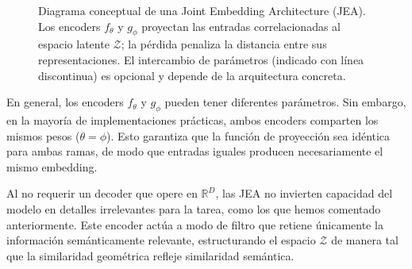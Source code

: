 \begin{figure}[H]
\centering
{}
\caption{Diagrama conceptual de una Joint Embedding Architecture (JEA). Los encoders $f_\theta$ y $g_\phi$ proyectan las entradas correlacionadas al espacio latente $\mathcal{Z}$; la pérdida penaliza la distancia entre sus representaciones. El intercambio de parámetros (indicado con línea discontinua) es opcional y depende de la arquitectura concreta.}
\label{fig:jea_diagram}
\end{figure}

En general, los encoders $f_{\theta}$ y $g_{\phi}$ pueden tener diferentes parámetros. Sin embargo, en la mayoría de implementaciones prácticas, ambos encoders comparten los mismos pesos ($\theta = \phi$). Esto garantiza que la función de proyección sea idéntica para ambas ramas, de modo que entradas iguales producen necesariamente el mismo embedding.

Al no requerir un decoder que opere en $\mathbb{R}^D$, las JEA no invierten capacidad del modelo en detalles irrelevantes para la tarea, como los que hemos comentado anteriormente. Este encoder actúa a modo de filtro que retiene únicamente la información semánticamente relevante, estructurando el espacio $\mathcal{Z}$ de manera tal que la similaridad geométrica refleje similaridad semántica.

